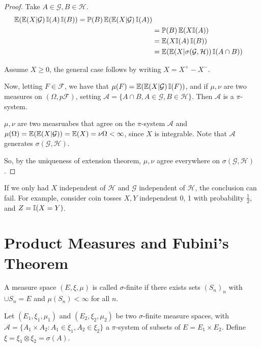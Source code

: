\begin{proof}
  Take $A \in \mathcal{G}, B \in \mathcal{H}$.
  \begin{align*}
    \E{\E{X | \mathcal{G}} \I{A} \I{B}} = \Prob{B} \E{\E{X |
        \mathcal{G}} \I{A}} \\
    &= \Prob{B} \E{X \I{A}} \\
    &= \E{X \I{A} \I{B}} \\
    &= \E{\E{X | \sigma(\mathcal{G}, \mathcal{H})} \I{A \cap B}}
  \end{align*}
  
  Assume $X \geq 0$, the general case follows by writing $X = X^{+} -
  X^{-}$.

  Now, letting $F \in \mathcal{F}$, we have that $\mu(F) = \E{\E{X |
      \mathcal{G}} \I{F}}$, and if $\mu, \nu$ are two measures on $(\Omega,p
  \mathcal{F})$, setting $\mathcal{A} = \{ A \cap B, A \in
  \mathcal{G}, B \in \mathcal{H} \}$.  Then $\mathcal{A}$ is a
$\pi$-system.

  $\mu, \nu$ are two measruabes that agree on the $\pi$-system
  $\mathcal{A}$ and $\mu(\Omega) = \E{\E{X|\mathcal{G}}} = \E{X} =
  \nu{\Omega} < \infty$, since $X$ is integrable.  Note that
  $\mathcal{A}$ generates $\sigma(\mathcal{G}, \mathcal{H})$.

  So, by the uniqueness of extension theorem, $\mu, \nu$ agree
  everywhere on $\sigma(\mathcal{G}, \mathcal{H})$.
\end{proof} 

\begin{remark}
  If we only had $X$ independent of $\mathcal{H}$ and $\mathcal{G}$
  independent of $\mathcal{H}$, the conclusion can fail.  For example,
  consider coin tosses $X, Y$ independent 0, 1 with probability
  $\frac{1}{2}$, and $Z = \I{X = Y}$.
\end{remark}


\section{Product Measures and Fubini's Theorem}
\label{sec:prod-meas-fubin}

\begin{defn}
  \label{defn:inequalities:3}
  A measure space $(E, \xi, \mu)$ is called $\sigma$-finite if there
  exists sets $(S_{n})_{n}$ with $\cup S_{n} = E$ and $\mu(S_{n}) <
  \infty$ for all $n$.
\end{defn}

Let $(E_{1}, \xi_{1}, \mu_{1})$ and $(E_{2}, \xi_{2}, \mu_{2})$ be two
$\sigma$-finite measure spaces, with $\mathcal{A} = \{ A_{1} \times
A_{2} : A_{1} \in \xi_{1}, A_{2} \in \xi_{2} \}$ a $\pi$-system of
subsets of $E = E_{1} \times E_{2}$.  Define $\xi = \xi_{1} \otimes
\xi_{2} = \sigma(A)$.

